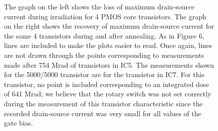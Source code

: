 \begin{figure}
\begin{minipage}[b]{0.5\textwidth}
\end{minipage}
\caption{The graph on the left shows the loss of maximum drain-source current during irradiation for 4 PMOS core transistors. The graph on the right shows the recovery of maximum drain-source current for the same 4 transistors during and after annealing.
As in Figure 6, lines are included to make the plots easier to read.
Once again, lines are not drawn through the points corresponding to measurements made after 754 Mrad of transistors in IC5.  The measurements shown for the 5000/5000 transistor are for the transistor in IC7.  For this transistor, no point is included corresponding to an integrated dose of 641 Mrad; we believe that the rotary switch was not set correctly during the measurement of this transistor characteristic since the recorded drain-source current was very small for all values of the gate bias.}
\label{fig:MaxCurDrive_PMOS}
\end{figure}

